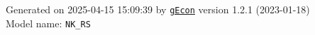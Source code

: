 \documentclass[10pt,a4paper]{article}
\numberwithin{equation}{section}
\begin{document}
\begin{landscape}
\begin{flushleft}{\large
Generated  on 2025-04-15 15:09:39 by \href{http://gecon.r-forge.r-project.org/}{\texttt{gEcon}} version 1.2.1 (2023-01-18)\\
Model name: \verb+NK_RS+
}\end{flushleft}


\end{landscape}

\end{document}
